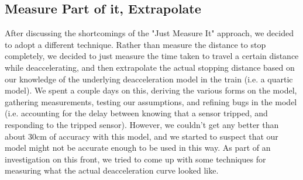 \documentclass[titlepage]{article}
\begin{document}
\subsection{Measure Part of it, Extrapolate}
After discussing the shortcomings of the "Just Measure It" approach, we decided
to adopt a different technique. Rather than measure the distance to stop
completely, we decided to just measure the time taken to travel a certain
distance while deaccelerating, and then extrapolate the actual stopping distance
based on our knowledge of the underlying deacceleration model in the train
(i.e. a quartic model). We spent a couple days on this, deriving the various
forms on the model, gathering measurements, testing our assumptions, and
refining bugs in the model (i.e. accounting for the delay between knowing that
a sensor tripped, and responding to the tripped sensor). However, we couldn't
get any better than about 30cm of accuracy with this model, and we started to
suspect that our model might not be accurate enough to be used in this way. As
part of an investigation on this front, we tried to come up with some techniques
for measuring what the actual deacceleration curve looked like.
\end{document}
